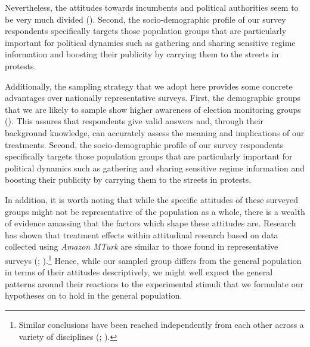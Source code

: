 \documentclass[11pt, ngerman,english,a4]{article}
\begin{document}
Nevertheless, the attitudes towards incumbents and political authorities seem to be very much divided (\citealt{Robertson2017}).
Second, the socio-demographic profile of our survey respondents specifically targets those population groups that are particularly important for political dynamics such as gathering and sharing sensitive regime information and boosting their publicity by carrying them to the streets in protests. 



Additionally, the sampling strategy that we adopt here provides some concrete advantages over nationally representative surveys. 
First, the demographic groups that we are likely to sample show higher awareness of election monitoring groups (\citealt{Robertson2017}). %
This assures that respondents give valid answers and, through their background knowledge, can accurately assess the meaning and implications of our treatments. 
Second, the socio-demographic profile of our survey respondents specifically targets those population groups that are particularly important for political dynamics such as gathering and sharing sensitive regime information and boosting their publicity by carrying them to the streets in protests. 

In addition, it is worth noting that while the specific attitudes of these surveyed groups might not be representative of the population as a whole, there is a wealth of evidence amassing that the factors which shape these attitudes are. Research has shown that treatment effects within attitudinal research based on data collected using \textit{Amazon MTurk} are similar to those found in representative surveys (\citealt{Clifford2015}; \citealt{Coppock2019}).\footnote{Similar conclusions have been reached independently from each other across a variety of disciplines (\citealt{Bartneck2015}; \citealt{Yang2015}).} Hence, while our sampled group differs from the general population in terms of their attitudes descriptively, we might well expect the general patterns around their reactions to the experimental stimuli that we formulate our hypotheses on to hold in the general population. 
\end{document}
